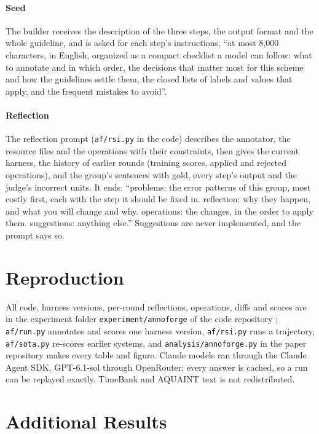 \paragraph{Seed} The builder receives the description of the three steps, the output format and the whole guideline, and is asked for each step's instructions, ``at most 8{,}000 characters, in English, organized as a compact checklist a model can follow: what to annotate and in which order, the decisions that matter most for this scheme and how the guidelines settle them, the closed lists of labels and values that apply, and the frequent mistakes to avoid''.

\paragraph{Reflection} The reflection prompt (\texttt{af/rsi.py} in the code) describes the annotator, the resource files and the operations with their constraints, then gives the current harness, the history of earlier rounds (training scores, applied and rejected operations), and the group's sentences with gold, every step's output and the judge's incorrect units. It ends: ``problems: the error patterns of this group, most costly first, each with the step it should be fixed in. reflection: why they happen, and what you will change and why. operations: the changes, in the order to apply them. suggestions: anything else.'' Suggestions are never implemented, and the prompt says so.

\section{Reproduction}
\label{app:reproduction}
All code, harness versions, per-round reflections, operations, diffs and scores are in the experiment folder \texttt{experiment/annoforge} of the code repository ; \texttt{af/run.py} annotates and scores one harness version, \texttt{af/rsi.py} runs a trajectory, \texttt{af/sota.py} re-scores earlier systems, and \texttt{analysis/annoforge.py} in the paper repository makes every table and figure. Claude models ran through the Claude Agent SDK, GPT-6.1-sol through OpenRouter; every answer is cached, so a run can be replayed exactly. TimeBank and AQUAINT text is not redistributed.

\section{Additional Results}
\label{app:more}

